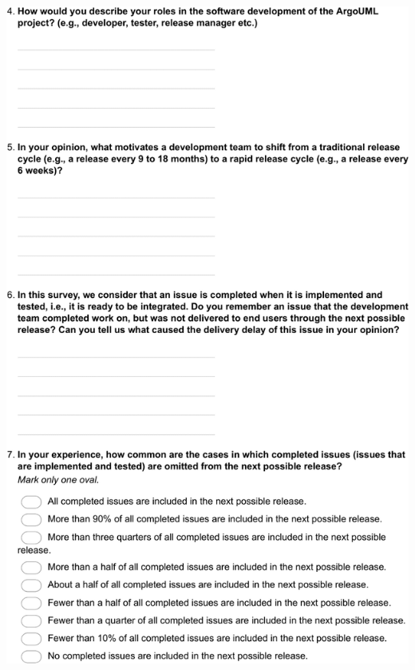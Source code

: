 \documentclass[
	12pt,				%
	openright,			%
	oneside,			%
	a4paper,			%
	french,				%
	spanish,			%
	brazil,				%
	english
	]{abntex2}
\newcounter{pt}
\newcounter{th}
\begin{document}
\begin{apendicesenv}
\includegraphics[width=.8\textwidth,keepaspectratio]{chapters/chapter5/appendix/ArgoUML2.pdf}


\end{apendicesenv}
\end{document}
